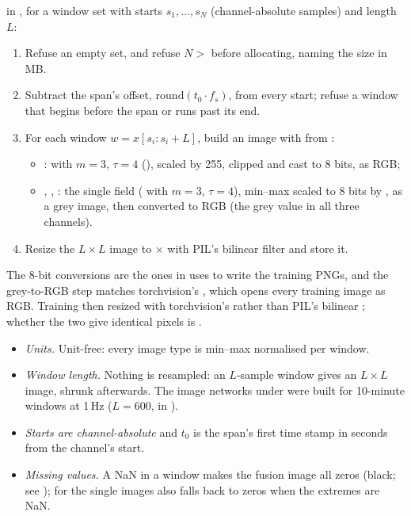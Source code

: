  in , for a window set with starts
$s_1,\dots,s_N$ (channel-absolute samples) and length $L$:
\begin{enumerate}
\item Refuse an empty set, and refuse $N > $  before allocating, naming the
  size in MB.
\item Subtract the span's offset, $\mathrm{round}(t_0 \cdot f_s)$, from every start; refuse a
  window that begins before the span or runs past its end.
\item For each window $w = x[s_i : s_i + L]$, build an image with
   from :
  \begin{itemize}
  \item {}:  with $m=3$, $\tau=4$
    (), scaled by 255, clipped and cast to 8 bits, as RGB;
  \item {}, , : the single field
    ( with $m=3$, $\tau=4$), min--max scaled to 8 bits by
    , as a grey image, then converted to RGB (the grey value in all three
    channels).
  \end{itemize}
\item Resize the $L \times L$ image to  $\times$  with PIL's
  bilinear filter and store it.
\end{enumerate}
The 8-bit conversions are the ones  in
 uses to write the training PNGs, and the
grey-to-RGB step matches torchvision's , which opens every training image
as RGB. Training then resized with torchvision's  rather than PIL's bilinear
; whether the two give identical pixels is .

\begin{itemize}
\item \emph{Units.} Unit-free: every image type is min--max normalised per window.
\item \emph{Window length.} Nothing is resampled: an $L$-sample window gives an
  $L \times L$ image, shrunk afterwards. The image networks under
   were built for 10-minute windows at 1\,Hz ($L = 600$,
   in ).
\item \emph{Starts are channel-absolute} and $t_0$ is the span's first time stamp in
  seconds from the channel's start.
\item \emph{Missing values.} A NaN in a window makes the fusion image all zeros (black;
  see ); for the single images  also
  falls back to zeros when the extremes are NaN.
\end{itemize}

